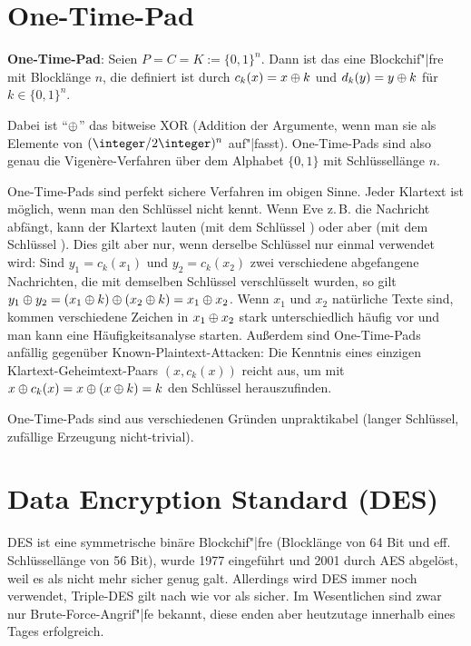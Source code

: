 \section{%
    One-Time-Pad%
}

\textbf{One-Time-Pad}:
Seien $P = C = K := \{0, 1\}^n$.
Dann ist das  eine Blockchif"|fre mit Blocklänge $n$,
die definiert ist durch $c_k(x) = x \oplus k$ und $d_k(y) = y \oplus k$ für $k \in \{0, 1\}^n$.

Dabei ist "`$\oplus$"' das bitweise XOR
(Addition der Argumente, wenn man sie als Elemente von $(\integer/2\integer)^n$ auf"|fasst).
One-Time-Pads sind also genau die Vigenère-Verfahren über dem Alphabet $\{0, 1\}$
mit Schlüssellänge $n$.

One-Time-Pads sind perfekt sichere Verfahren im obigen Sinne.
Jeder Klartext ist möglich, wenn man den Schlüssel nicht kennt.
Wenn Eve z.\,B. die Nachricht  abfängt, kann der Klartext  lauten
(mit dem Schlüssel ) oder aber  (mit dem Schlüssel ).
Dies gilt aber nur, wenn derselbe Schlüssel nur einmal verwendet wird:
Sind $y_1 = c_k(x_1)$ und $y_2 = c_k(x_2)$ zwei verschiedene abgefangene Nachrichten,
die mit demselben Schlüssel verschlüsselt wurden, so gilt
$y_1 \oplus y_2 = (x_1 \oplus k) \oplus (x_2 \oplus k) = x_1 \oplus x_2$.
Wenn $x_1$ und $x_2$ natürliche Texte sind, kommen verschiedene Zeichen in
$x_1 \oplus x_2$ stark unterschiedlich häufig vor und man kann eine Häufigkeitsanalyse starten.
Außerdem sind One-Time-Pads anfällig gegenüber Known-Plaintext-Attacken:
Die Kenntnis eines einzigen Klartext-Geheimtext-Paars $(x, c_k(x))$ reicht aus, um mit
$x \oplus c_k(x) = x \oplus (x \oplus k) = k$ den Schlüssel herauszufinden.

One-Time-Pads sind aus verschiedenen Gründen unpraktikabel
(langer Schlüssel, zufällige Erzeugung nicht-trivial).

\section{%
    Data Encryption Standard (DES)%
}

DES ist eine symmetrische binäre Blockchif"|fre
(Blocklänge von 64 Bit und eff. Schlüssellänge von 56 Bit), wurde 1977 eingeführt und 2001 durch
AES abgelöst, weil es als nicht mehr sicher genug galt.
Allerdings wird DES immer noch verwendet, Triple-DES gilt nach wie vor als sicher.
Im Wesentlichen sind zwar nur Brute-Force-Angrif"|fe bekannt,
diese enden aber heutzutage innerhalb eines Tages erfolgreich.


